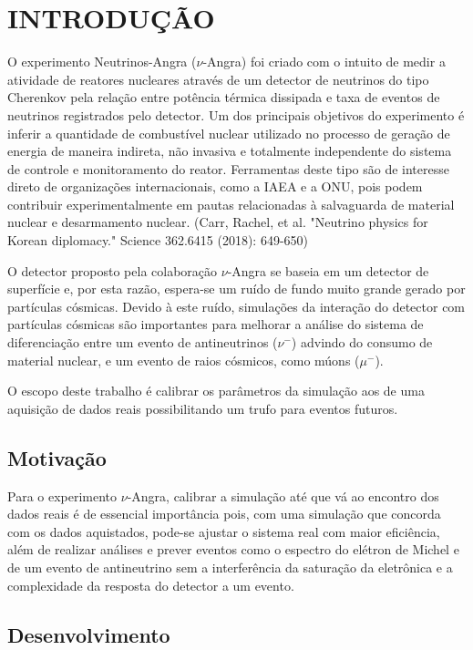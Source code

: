 \chapter{INTRODUÇÃO} \label{cap:intro}
\vspace{-2cm}

O experimento Neutrinos-Angra ($\nu$-Angra) foi criado com o intuito de medir a atividade de reatores nucleares através de um detector de neutrinos do tipo Cherenkov pela relação entre potência térmica dissipada e taxa de eventos de neutrinos registrados pelo detector. Um dos principais objetivos do experimento é inferir a quantidade de combustível nuclear utilizado no processo de geração de energia de maneira indireta, não invasiva e totalmente independente do sistema de controle e monitoramento do reator. Ferramentas deste tipo são de interesse direto de organizações internacionais, como a IAEA e a ONU, pois podem contribuir experimentalmente em pautas relacionadas à salvaguarda de material nuclear e desarmamento nuclear. (Carr, Rachel, et al. "Neutrino physics for Korean diplomacy." Science 362.6415 (2018): 649-650)

O detector proposto pela colaboração $\nu$-Angra se baseia em um detector de superfície e, por esta razão, espera-se um ruído de fundo muito grande gerado por partículas cósmicas. Devido à este ruído, simulações da interação do detector com partículas cósmicas são importantes para melhorar a análise do sistema de diferenciação entre um evento de antineutrinos ($\nu^-$) advindo do consumo de material nuclear, e um evento de raios cósmicos, como múons ($\mu^-$). 

O escopo deste trabalho é calibrar os parâmetros da simulação aos de uma aquisição de dados reais possibilitando um trufo para eventos futuros.

\section{Motivação} 

Para o experimento $\nu$-Angra, calibrar a simulação até que vá ao encontro dos dados reais é de essencial importância pois, com uma simulação que concorda com os dados aquistados, pode-se ajustar o sistema real com maior eficiência, além de realizar análises e prever eventos como o espectro do elétron de Michel e de um evento de antineutrino sem a interferência da saturação da eletrônica e a complexidade da resposta do detector a um evento. 

\section{Desenvolvimento}

